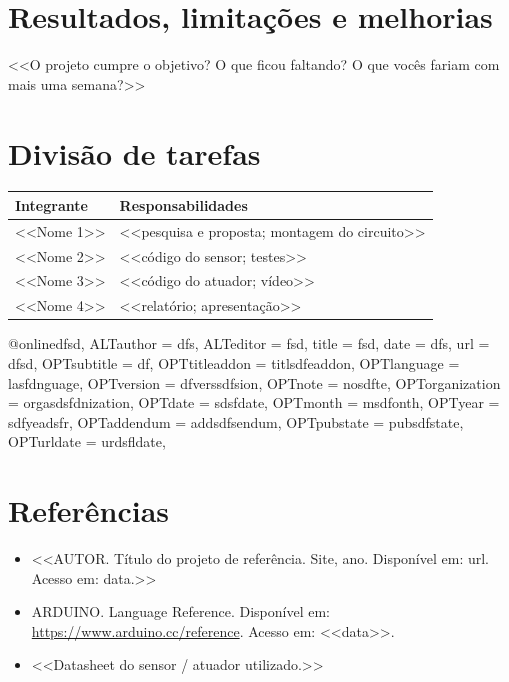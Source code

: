 \documentclass{abntex2}
\begin{document}
\section{Resultados, limitações e melhorias}
<<O projeto cumpre o objetivo? O que ficou faltando? O que vocês fariam com mais uma semana?>>

\section{Divisão de tarefas}
\begin{table}[H]
  \centering
  \begin{tabular}{ll}
    \toprule
    \textbf{Integrante} & \textbf{Responsabilidades} \\
    \midrule
    <<Nome 1>> & <<pesquisa e proposta; montagem do circuito>> \\
    <<Nome 2>> & <<código do sensor; testes>> \\
    <<Nome 3>> & <<código do atuador; vídeo>> \\
    <<Nome 4>> & <<relatório; apresentação>> \\
    \bottomrule
  \end{tabular}
\end{table}

@online{dfsd,
	ALTauthor = {dfs},
	ALTeditor = {fsd},
	title = {fsd},
	date = {dfs},
	url = {dfsd},
	OPTsubtitle = {df},
	OPTtitleaddon = {titlsdfeaddon},
	OPTlanguage = {lasfdnguage},
	OPTversion = df{verssdfsion},
	OPTnote = {nosdfte},
	OPTorganization = {orgasdsfdnization},
	OPTdate = {sdsfdate},
	OPTmonth = {msdfonth},
	OPTyear = {sdfyeadsfr},
	OPTaddendum = {addsdfsendum},
	OPTpubstate = {pubsdfstate},
	OPTurldate = {urdsfldate},
}
\section*{Referências}
\begin{itemize}
  \item <<AUTOR. Título do projeto de referência. Site, ano. Disponível em: url. Acesso em: data.>>
  \item ARDUINO. Language Reference. Disponível em: \url{https://www.arduino.cc/reference}. Acesso em: <<data>>.
  \item <<Datasheet do sensor / atuador utilizado.>>
\end{itemize}
\end{document}

